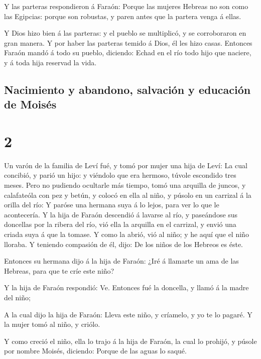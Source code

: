  Y las parteras respondieron á Faraón: Porque las mujeres
Hebreas no son como las Egipcias: porque son robustas, y paren antes que
la partera venga á ellas.

 Y Dios hizo bien á las parteras: y el pueblo se
multiplicó, y se corroboraron en gran manera.  Y por
haber las parteras temido á Dios, él les hizo casas. 
Entonces Faraón mandó á todo su pueblo, diciendo: Echad en el río todo
hijo que naciere, y á toda hija reservad la vida.

\hypertarget{nacimiento-y-abandono-salvaciuxf3n-y-educaciuxf3n-de-moisuxe9s}{%
\subsection{Nacimiento y abandono, salvación y educación de
Moisés}\label{nacimiento-y-abandono-salvaciuxf3n-y-educaciuxf3n-de-moisuxe9s}}

\hypertarget{section-1}{%
\section{2}\label{section-1}}

 Un varón de la familia de Leví fué, y tomó por mujer una
hija de Leví:  La cual concibió, y parió un hijo: y
viéndolo que era hermoso, túvole escondido tres meses. 
Pero no pudiendo ocultarle más tiempo, tomó una arquilla de juncos, y
calafateóla con pez y betún, y colocó en ella al niño, y púsolo en un
carrizal á la orilla del río:  Y paróse una hermana suya á
lo lejos, para ver lo que le acontecería.  Y la hija de
Faraón descendió á lavarse al río, y paseándose sus doncellas por la
ribera del río, vió ella la arquilla en el carrizal, y envió una criada
suya á que la tomase.  Y como la abrió, vió al niño; y he
aquí que el niño lloraba. Y teniendo compasión de él, dijo: De los niños
de los Hebreos es éste.

 Entonces su hermana dijo á la hija de Faraón: ¿Iré á
llamarte un ama de las Hebreas, para que te críe este niño?

 Y la hija de Faraón respondió: Ve. Entonces fué la
doncella, y llamó á la madre del niño;

 A la cual dijo la hija de Faraón: Lleva este niño, y
críamelo, y yo te lo pagaré. Y la mujer tomó al niño, y criólo.

 Y como creció el niño, ella lo trajo á la hija de
Faraón, la cual lo prohijó, y púsole por nombre Moisés, diciendo: Porque
de las aguas lo saqué.

